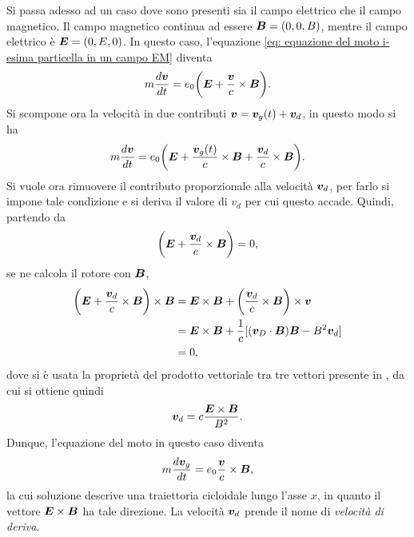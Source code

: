 Si passa adesso ad un caso dove sono presenti sia il campo elettrico che il campo magnetico. Il campo magnetico continua ad essere $\bm{B} = (0,0,B)$, mentre il campo elettrico è $\bm{E} = (0,E,0)$. In questo caso, l'equazione \eqref{eq: equazione del moto i-esima particella in un campo EM} diventa
\begin{equation}
    m\frac{d\bm{v}}{dt} = e_0\bigg(\bm{E} + \frac{\bm{v}}{c} \times \bm{B}\bigg).
\end{equation}
Si scompone ora la velocità in due contributi $\bm{v} = \bm{v}_g(t) + \bm{v}_d$, in questo modo si ha 
\begin{equation}
    m\frac{d\bm{v}}{dt} = e_0\bigg(\bm{E} + \frac{\bm{v}_g(t)}{c} \times \bm{B} + \frac{\bm{v}_d}{c} \times \bm{B}\bigg).
\end{equation}
Si vuole ora rimuovere il contributo proporzionale alla velocità $\bm{v}_d$, per farlo si impone tale condizione e si deriva il valore di $v_d$ per cui questo accade. Quindi, partendo da 
\begin{equation}
    \bigg(\bm{E} + \frac{\bm{v}_d}{c} \times \bm{B}\bigg) = 0,
\end{equation}
se ne calcola il rotore con $\bm{B}$, 
\begin{equation}
    \begin{split}
        \bigg(\bm{E} + \frac{\bm{v}_d}{c} \times \bm{B}\bigg) \times \bm{B} &= \bm{E} \times \bm{B} + \bigg(\frac{\bm{v}_d}{c} \times \bm{B}\bigg)\times \bm{v} \\
        &= \bm{E} \times \bm{B} + \frac{1}{c}[(\bm{v}_D \cdot \bm{B})\bm{B} - B^2\bm{v}_d] \\
        &= 0,
    \end{split}
\end{equation}
dove si è usata la proprietà del prodotto vettoriale tra tre vettori presente in \cite[4]{NRLPlasmaFormulary}, da cui si ottiene quindi 
\begin{equation}
\label{eq: velocità di deriva}
    \bm{v}_d = c\frac{\bm{E} \times \bm{B}}{B^2}.
\end{equation}
Dunque, l'equazione del moto in questo caso diventa 
\begin{equation}
    m\frac{d\bm{v}_g}{dt} = e_0\frac{\bm{v}}{c} \times \bm{B},
\end{equation}
la cui soluzione descrive una traiettoria cicloidale lungo l'asse $x$, in quanto il vettore $\bm{E} \times \bm{B}$ ha tale direzione. La velocità $\bm{v}_d$ prende il nome di \emph{velocità di deriva}.

